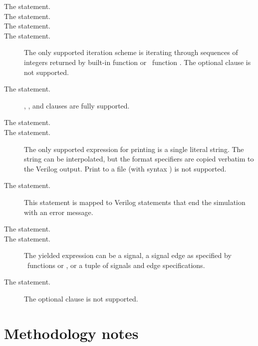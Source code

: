 \begin{description}

\item[The  statement.]

\item[The  statement.]

\item[The  statement.]

\item[The  statement.]
The only supported iteration scheme is iterating through sequences of
integers returned by built-in function  or \myhdl\
function .  The optional  clause is
not supported.

\item[The  statement.]
\keyword{if}, , and  clauses
are fully supported.

\item[The  statement.]

\item[The  statement.]
The only supported expression for printing is
a single literal string.
The string can be interpolated, but the format specifiers
are copied verbatim to the Verilog output.
Print to a file (with syntax ) is not supported.

\item[The  statement.]
This statement is mapped to Verilog statements
that end the simulation with an error message.

\item[The  statement.]

\item[The  statement.] 
The yielded expression can be a signal, a signal edge
as specified by \myhdl\ functions 
or , or a tuple of signals and
edge specifications.

\item[The  statement.]
The optional 
clause is not supported.

\end{description}

\section{Methodology notes\label{conv-meth}}

